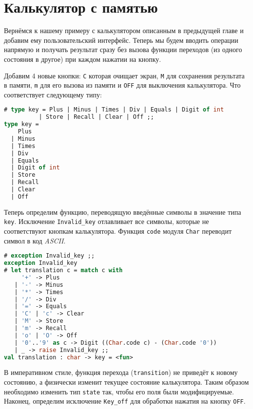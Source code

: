 \section{Калькулятор с памятью}
\label{sec:calculator_with_memory}

Вернёмся к нашему примеру с калькулятором описанным в предыдущей главе и добавим
ему пользовательский интерфейс. Теперь мы будем вводить операции напрямую и
получать результат сразу без вызова функции переходов (из одного состояния в
другое) при каждом нажатии на кнопку.

Добавим 4 новые кнопки: \texttt{C} которая очищает экран, \texttt{M} для
сохранения результата в памяти, \texttt{m} для его вызова из памяти и
\texttt{OFF} для выключения калькулятора. Что соответствует следующему типу:

\begin{lstlisting}[language=OCaml]
# type key = Plus | Minus | Times | Div | Equals | Digit of int
          | Store | Recall | Clear | Off ;;
type key =
    Plus
  | Minus
  | Times
  | Div
  | Equals
  | Digit of int
  | Store
  | Recall
  | Clear
  | Off
\end{lstlisting}

Теперь определим функцию, переводящую введённые символы в значение типа
\texttt{key}. Исключение \texttt{Invalid\_key} отлавливает все символы, которые
не соответствуют кнопкам калькулятора. Функция \texttt{code} модуля
\texttt{Char} переводит символ в код {\it ASCII}.

\begin{lstlisting}[language=OCaml]
# exception Invalid_key ;;
exception Invalid_key
# let translation c = match c with
     '+' -> Plus
   | '-' -> Minus
   | '*' -> Times
   | '/' -> Div
   | '=' -> Equals
   | 'C' | 'c' -> Clear
   | 'M' -> Store
   | 'm' -> Recall
   | 'o' | 'O' -> Off
   | '0'..'9' as c -> Digit ((Char.code c) - (Char.code '0'))
   | _ -> raise Invalid_key ;;
val translation : char -> key = <fun>
\end{lstlisting}

В императивном стиле, функция перехода (\texttt{transition}) не приведёт к
новому состоянию, а физически изменит текущее состояние калькулятора. Таким
образом необходимо изменить тип \texttt{state} так, чтобы его поля были
модифицируемые. Наконец, определим исключение \texttt{Key\_off} для обработки
нажатия на кнопку \texttt{OFF}.

